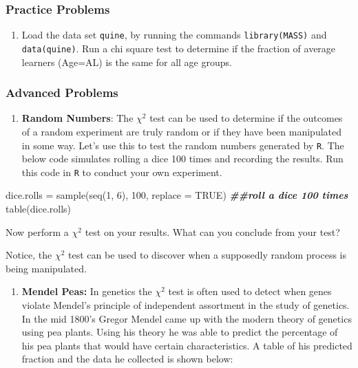 \documentclass[
]{book}
\newenvironment{Shaded}{\begin{snugshade}}{\end{snugshade}}
\newcommand{\AttributeTok}[1]{\textcolor[rgb]{0.77,0.63,0.00}{#1}}
\newcommand{\ConstantTok}[1]{\textcolor[rgb]{0.00,0.00,0.00}{#1}}
\newcommand{\DecValTok}[1]{\textcolor[rgb]{0.00,0.00,0.81}{#1}}
\newcommand{\DocumentationTok}[1]{\textcolor[rgb]{0.56,0.35,0.01}{\textbf{\textit{#1}}}}
\newcommand{\FunctionTok}[1]{\textcolor[rgb]{0.00,0.00,0.00}{#1}}
\newcommand{\NormalTok}[1]{#1}
\newcommand{\OtherTok}[1]{\textcolor[rgb]{0.56,0.35,0.01}{#1}}
\providecommand{\tightlist}{%
  \setlength{\itemsep}{0pt}\setlength{\parskip}{0pt}}
\theoremstyle{definition}
\theoremstyle{definition}
\theoremstyle{definition}
\theoremstyle{definition}
\theoremstyle{remark}
\begin{document}
\hypertarget{practice-problems-14}{%
\subsubsection{Practice Problems}\label{practice-problems-14}}

\begin{enumerate}
\def\labelenumi{\arabic{enumi}.}
\tightlist
\item
  Load the data set \texttt{quine}, by running the commands \texttt{library(MASS)} and \texttt{data(quine)}. Run a chi square test to determine if the fraction of average learners (Age=AL) is the same for all age groups.
\end{enumerate}

\hypertarget{advanced-problems-14}{%
\subsubsection{Advanced Problems}\label{advanced-problems-14}}

\begin{enumerate}
\def\labelenumi{\arabic{enumi}.}
\tightlist
\item
  \textbf{Random Numbers}: The \(\chi^2\) test can be used to determine if the outcomes of a random experiment are truly random or if they have been manipulated in some way. Let's use this to test the random numbers generated by \texttt{R}. The below code simulates rolling a dice 100 times and recording the results. Run this code in \texttt{R} to conduct your own experiment.
\end{enumerate}

\begin{Shaded}
\begin{Highlighting}[]
\NormalTok{dice.rolls }\OtherTok{=} \FunctionTok{sample}\NormalTok{(}\FunctionTok{seq}\NormalTok{(}\DecValTok{1}\NormalTok{, }\DecValTok{6}\NormalTok{), }\DecValTok{100}\NormalTok{, }\AttributeTok{replace =} \ConstantTok{TRUE}\NormalTok{)  }\DocumentationTok{\#\#roll a dice 100 times}
\FunctionTok{table}\NormalTok{(dice.rolls)}
\end{Highlighting}
\end{Shaded}

Now perform a \(\chi^2\) test on your results. What can you conclude from your test?

Notice, the \(\chi^2\) test can be used to discover when a supposedly random process is being manipulated.

\begin{enumerate}
\def\labelenumi{\arabic{enumi}.}
\setcounter{enumi}{1}
\tightlist
\item
  \textbf{Mendel Peas: } In genetics the \(\chi^2\) test is often used to detect when genes violate Mendel's principle of independent assortment in the study of genetics. In the mid 1800's Gregor Mendel came up with the modern theory of genetics using pea plants. Using his theory he was able to predict the percentage of his pea plants that would have certain characteristics. A table of his predicted fraction and the data he collected is shown below:
\end{enumerate}
\end{document}
